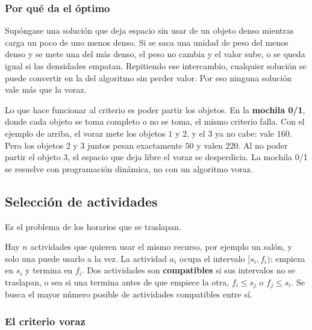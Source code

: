 \documentclass[11pt,letterpaper]{article}
\begin{document}
\subsubsection*{Por qué da el óptimo}

Supóngase una solución que deja espacio sin usar de un objeto denso
mientras carga un poco de uno menos denso. Si se saca una unidad de
peso del menos denso y se mete una del más denso, el peso no cambia y
el valor sube, o se queda igual si las densidades empatan. Repitiendo
ese intercambio, cualquier solución se puede convertir en la del
algoritmo sin perder valor. Por eso ninguna solución vale más que la
voraz.

\begin{ojo}
  Lo que hace funcionar al criterio es poder partir los objetos. En
  la \textbf{mochila 0/1}, donde cada objeto se toma completo o no se
  toma, el mismo criterio falla. Con el ejemplo de arriba, el voraz
  mete los objetos $1$ y $2$, y el $3$ ya no cabe: vale $160$. Pero
  los objetos $2$ y $3$ juntos pesan exactamente $50$ y valen $220$.
  Al no poder partir el objeto $3$, el espacio que deja libre el
  voraz se desperdicia. La mochila 0/1 se resuelve con programación
  dinámica, no con un algoritmo voraz.
\end{ojo}


\subsection*{Selección de actividades}

Es el problema de los horarios que se traslapan.

\begin{definicion}
  Hay $n$ actividades que quieren usar el mismo recurso, por ejemplo
  un salón, y solo una puede usarlo a la vez. La actividad $a_i$
  ocupa el intervalo $[s_i, f_i)$: empieza en $s_i$ y termina en
  $f_i$. Dos actividades son \textbf{compatibles} si sus intervalos no
  se traslapan, o sea si una termina antes de que empiece la otra,
  $f_i \leq s_j$ o $f_j \leq s_i$. Se busca el mayor número posible de
  actividades compatibles entre sí.
\end{definicion}

\subsubsection*{El criterio voraz}
\end{document}

